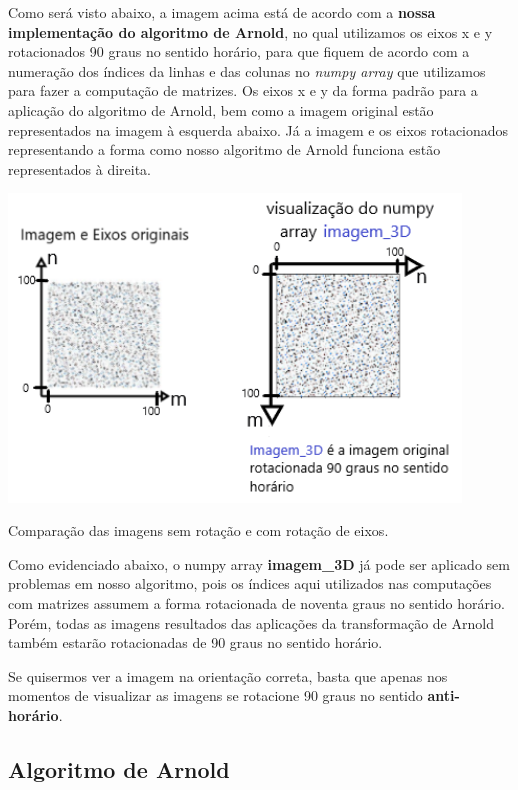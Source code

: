\documentclass[a4paper, 12pt]{article}
\begin{document}
Como será visto abaixo, a imagem acima está de acordo com a \textbf{nossa implementação do algoritmo de Arnold}, no qual utilizamos os eixos x e y rotacionados 90 graus no sentido horário, para que fiquem de acordo com a numeração dos índices da linhas e das colunas no \textit{numpy array} que utilizamos para fazer a computação de matrizes. Os eixos x e y da forma padrão para a aplicação do algoritmo de Arnold, bem como a imagem original estão representados na imagem à esquerda abaixo. Já a imagem e os eixos rotacionados representando a forma como nosso algoritmo de Arnold funciona estão representados à direita.

\begin{center}
    \includegraphics[width=12cm]{02_comparacao_rot.png}
    
    Comparação das imagens sem rotação e com rotação de eixos.
\end{center}

Como evidenciado abaixo, o numpy array \textbf{imagem\_3D} já pode ser aplicado sem problemas em nosso algoritmo, pois os índices aqui utilizados nas computações com matrizes assumem a forma rotacionada de noventa graus no sentido horário.
Porém, todas as imagens resultados das aplicações da transformação de Arnold também estarão rotacionadas de 90 graus no sentido horário.

Se quisermos ver a imagem na orientação correta, basta que apenas nos momentos de visualizar as imagens se rotacione 90 graus no sentido \textbf{anti-horário}.

\subsection{Algoritmo de Arnold}
\end{document}
